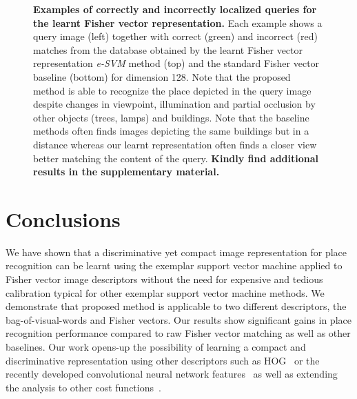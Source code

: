 \documentclass[10pt,twocolumn,letterpaper]{article}
\begin{document}
            \begin{table}[b]
               \begin{centering}
                  
                  \caption{ \textbf{Results on Pittsburgh 55k dataset - Fisher vectors.}
                     The fraction of correctly recognized queries (recall@K)
                     in top $K\in\{1,2,5,10,20\}$ retrieved images.
                     The proposed method (\emph{e-SVM}) has been applied to Fisher vectors compressed to different dimensions.
                     The learnt descriptors by the proposed method (FV e-SVM) consistently improve over the raw Fisher vector descriptors across the whole range of $K$  and all dimensions.
                  }
               \label{tab:recall2}
               \end{centering}
            \end{table}       
 
   \begin{figure}[h!t]
      
      \caption{
          \textbf{Examples of correctly and incorrectly localized queries for the learnt Fisher vector representation.}
          Each example shows a query image (left) together with correct (green) and incorrect (red) matches from the database obtained by the learnt Fisher vector representation \emph{e-SVM} method (top) and the standard Fisher vector baseline (bottom) for dimension 128. Note that the proposed method is able to recognize the place depicted in the query image despite changes in viewpoint, illumination and partial occlusion by other objects (trees, lamps) and buildings. 
          Note that the baseline methods often finds images depicting the same buildings but in a distance whereas our learnt representation often finds a closer view better matching the content of the query. {\bf Kindly find additional results in the supplementary material.}
      }
      \label{fig:images}
   \end{figure}


   \section{Conclusions}
      We have shown that a discriminative yet compact image representation for place recognition can be learnt using the exemplar support vector machine applied to Fisher vector image descriptors without the need for expensive and tedious calibration typical for other exemplar  support vector machine methods. We demonstrate that proposed method is applicable to two different descriptors, the bag-of-visual-words and Fisher vectors.
      Our results show significant gains in place recognition performance compared to raw Fisher vector matching as well as other baselines. Our work opens-up the possibility of learning a compact and discriminative representation using other descriptors such as HOG~\cite{Dalal05} or the recently developed convolutional neural network features~\cite{Donahue13,Krizhevsky12,Oquab14,Sermanet13} as well as extending the analysis to other cost functions~\cite{Gharbi12,Hariharan12}.
\clearpage 
\small{
   
   
}
\end{document}

